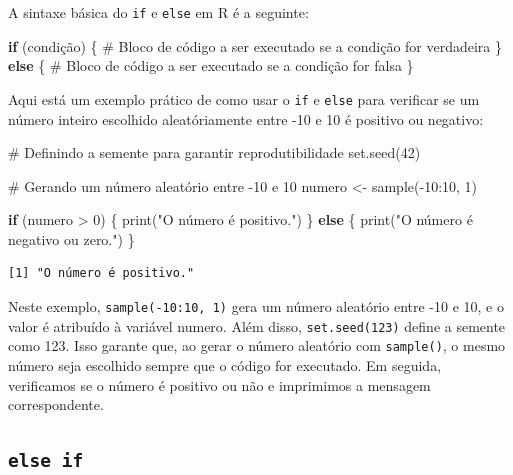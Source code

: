 \documentclass[
  portuguese,
  letterpaper,
  DIV=11,
  numbers=noendperiod]{scrreprt}
\newenvironment{Shaded}{\begin{snugshade}}{\end{snugshade}}
\newcommand{\CommentTok}[1]{\textcolor[rgb]{0.37,0.37,0.37}{#1}}
\newcommand{\ControlFlowTok}[1]{\textcolor[rgb]{0.00,0.23,0.31}{\textbf{#1}}}
\newcommand{\DecValTok}[1]{\textcolor[rgb]{0.68,0.00,0.00}{#1}}
\newcommand{\FunctionTok}[1]{\textcolor[rgb]{0.28,0.35,0.67}{#1}}
\newcommand{\NormalTok}[1]{\textcolor[rgb]{0.00,0.23,0.31}{#1}}
\newcommand{\OtherTok}[1]{\textcolor[rgb]{0.00,0.23,0.31}{#1}}
\newcommand{\SpecialCharTok}[1]{\textcolor[rgb]{0.37,0.37,0.37}{#1}}
\newcommand{\StringTok}[1]{\textcolor[rgb]{0.13,0.47,0.30}{#1}}
\theoremstyle{definition}
\theoremstyle{remark}
\begin{document}
A sintaxe básica do \texttt{if} e \texttt{else} em R é a seguinte:

\begin{Shaded}
\begin{Highlighting}[]
\ControlFlowTok{if}\NormalTok{ (condição) \{}
  \CommentTok{\# Bloco de código a ser executado se a condição for verdadeira}
\NormalTok{\} }\ControlFlowTok{else}\NormalTok{ \{}
  \CommentTok{\# Bloco de código a ser executado se a condição for falsa}
\NormalTok{\}}
\end{Highlighting}
\end{Shaded}

Aqui está um exemplo prático de como usar o \texttt{if} e \texttt{else}
para verificar se um número inteiro escolhido aleatóriamente entre -10 e
10 é positivo ou negativo:

\begin{Shaded}
\begin{Highlighting}[]
\CommentTok{\# Definindo a semente para garantir reprodutibilidade}
\FunctionTok{set.seed}\NormalTok{(}\DecValTok{42}\NormalTok{)}

\CommentTok{\# Gerando um número aleatório entre {-}10 e 10}
\NormalTok{numero }\OtherTok{\textless{}{-}} \FunctionTok{sample}\NormalTok{(}\SpecialCharTok{{-}}\DecValTok{10}\SpecialCharTok{:}\DecValTok{10}\NormalTok{, }\DecValTok{1}\NormalTok{)}

\ControlFlowTok{if}\NormalTok{ (numero }\SpecialCharTok{\textgreater{}} \DecValTok{0}\NormalTok{) \{}
  \FunctionTok{print}\NormalTok{(}\StringTok{"O número é positivo."}\NormalTok{)}
\NormalTok{\} }\ControlFlowTok{else}\NormalTok{ \{}
  \FunctionTok{print}\NormalTok{(}\StringTok{"O número é negativo ou zero."}\NormalTok{)}
\NormalTok{\}}
\end{Highlighting}
\end{Shaded}

\begin{verbatim}
[1] "O número é positivo."
\end{verbatim}

Neste exemplo, \texttt{sample(-10:10,\ 1)} gera um número aleatório
entre -10 e 10, e o valor é atribuído à variável numero. Além disso,
\texttt{set.seed(123)} define a semente como 123. Isso garante que, ao
gerar o número aleatório com \texttt{sample()}, o mesmo número seja
escolhido sempre que o código for executado. Em seguida, verificamos se
o número é positivo ou não e imprimimos a mensagem correspondente.

\subsection{\texorpdfstring{\texttt{else\ if}}{else if}}\label{else-if}
\end{document}
